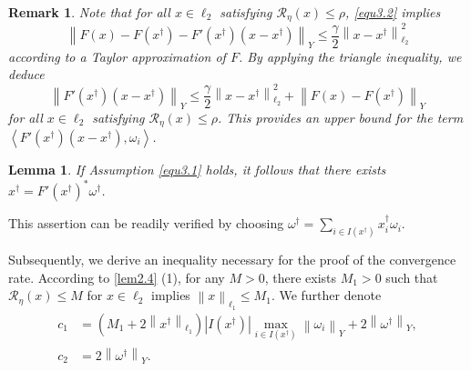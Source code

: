 \documentclass[a4paper,12pt]{article}
\newtheorem{lemma}[theorem]{Lemma}
\newtheorem{remark}[theorem]{Remark}
\numberwithin{equation}{section}
\begin{document}
\begin{remark}\label{rem3.2}
    Note that for all $x\in\ell_{2}$ satisfying $\mathcal{R}_{\eta}\left(x\right)\leq \rho$, \eqref{equ3.2} implies
    \begin{equation}\label{equ3.3}
        \left\|F\left(x\right)-F\left(x^{\dagger}\right)-F'\left(x^{\dagger}\right) \left(x-x^{\dagger}\right)\right\|_{Y}\leq \frac{\gamma}{2}\left\|x-x^{\dagger} \right\|_{\ell_{2}}^{2}
    \end{equation}
    according to a Taylor approximation of $F$. By applying the triangle inequality, we deduce
    \begin{equation}\label{equ3.4}
        \left\|F'\left(x^{\dagger}\right)\left(x-x^{\dagger}\right)\right\|_{Y}\leq \frac{\gamma}{2}\left\|x-x^{\dagger}\right\|_{\ell_{2}}^{2}+ \left\|F\left(x\right)-F\left(x^{\dagger}\right)\right\|_{Y}
    \end{equation}
    for all $x\in\ell_{2}$ satisfying $\mathcal{R}_{\eta}\left(x\right)\leq\rho$. This provides an upper bound for the term $\left<F'\left(x^{\dagger}\right) \left(x-x^{\dagger}\right),\omega_{i}\right>$. 
\end{remark}

\begin{lemma}\label{lem3.3}
    If Assumption \eqref{equ3.1} holds, it follows that there exists $x^{\dagger}= F'\left(x^{\dagger}\right)^{*}\omega^{\dagger}$. 
\end{lemma}

\par This assertion can be readily verified by choosing $\omega^{\dagger}=\sum_{i\in I\left(x^{\dagger}\right)}x_{i}^{\dagger}\omega_{i}$.

\par Subsequently, we derive an inequality necessary for the proof of the convergence rate. According to \ref{lem2.4} (1), for any $M>0$, there exists $M_{1}>0$ such that $\mathcal{R}_{\eta}\left(x\right)\leq M$ for $x\in\ell_{2}$ implies $\left\|x\right\|_{\ell_{1}}\leq M_{1}$. We further denote
\begin{align}
    c_{1} &= \left(M_{1}+2\left\|x^{\dagger}\right\|_{\ell_{1}}\right) \left|I\left(x^{\dagger}\right)\right|\max_{i\in I\left(x^{\dagger}\right)} \left\|\omega_{i}\right\|_{Y}+2\left\|\omega^{\dagger}\right\|_{Y},  \label{equ3.5} \\
    c_{2} &= 2\left\|\omega^{\dagger}\right\|_{Y}.  \label{equ3.6}
\end{align}
\end{document}
